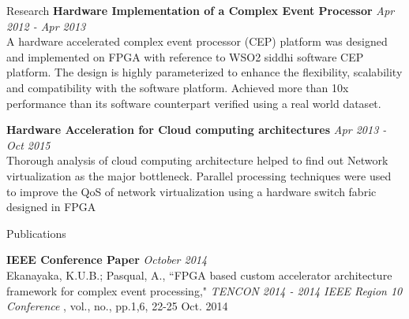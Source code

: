 \documentclass[
11pt, %
]{./assets/resume} %
\begin{document}
\begin{rSection}{Research}
	\textbf{Hardware Implementation of a Complex Event Processor} \hfill \textit{Apr 2012 - Apr 2013}\\
	A hardware accelerated complex event processor (CEP) platform was designed and implemented on FPGA with reference to WSO2 siddhi software CEP platform.
	The design is highly parameterized to enhance the flexibility, scalability and compatibility with the software platform.
	Achieved more than 10x performance than its software counterpart verified using a real world dataset.

	
	\textbf{Hardware Acceleration for Cloud computing architectures} \hfill \textit{Apr 2013 - Oct 2015}\\
	Thorough analysis of cloud computing architecture helped to find out Network virtualization as the major bottleneck.
	Parallel processing techniques were used to improve the QoS of network virtualization using a hardware switch fabric designed in FPGA

	
\end{rSection}

\begin{rSection}{Publications}

	\textbf{IEEE Conference Paper } \hfill  \textit{October 2014}\\
	Ekanayaka, K.U.B.; Pasqual, A., ``FPGA based custom accelerator architecture framework for complex event processing," \emph{TENCON 2014 - 2014 IEEE Region 10 Conference} , vol., no., pp.1,6, 22-25 Oct. 2014

\end{rSection}
 
\end{document}
